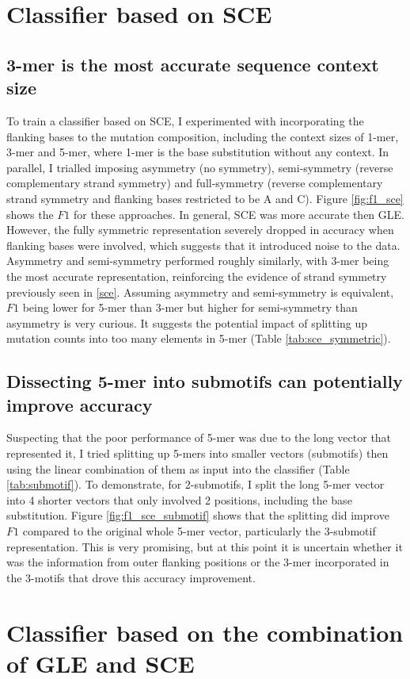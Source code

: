 

\newpage
\section{Classifier based on SCE}\label{ml:sce}

\subsection{3-mer is the most accurate sequence context size}
To train a classifier based on SCE, I experimented with incorporating the flanking bases to the mutation composition, including the context sizes of 1-mer, 3-mer and 5-mer, where 1-mer is the base substitution without any context. In parallel, I trialled imposing asymmetry (no symmetry), semi-symmetry (reverse complementary strand symmetry) and full-symmetry (reverse complementary strand symmetry and flanking bases restricted to be A and C). Figure \ref{fig:f1_sce} shows the $F1$ for these approaches. In general, SCE was more accurate then GLE. However, the fully symmetric representation severely dropped in accuracy when flanking bases were involved, which suggests that it introduced noise to the data. Asymmetry and semi-symmetry performed roughly similarly, with 3-mer being the most accurate representation, reinforcing the evidence of strand symmetry previously seen in \ref{sce}. Assuming asymmetry and semi-symmetry is equivalent, $F1$ being lower for 5-mer than 3-mer but higher for semi-symmetry than asymmetry is very curious. It suggests the potential impact of splitting up mutation counts into too many elements in 5-mer (Table \ref{tab:sce_symmetric}).



\subsection{Dissecting 5-mer into submotifs can potentially improve accuracy}
Suspecting that the poor performance of 5-mer was due to the long vector that represented it, I tried splitting up 5-mers into smaller vectors (submotifs) then using the linear combination of them as input into the classifier (Table \ref{tab:submotif}). To demonstrate, for 2-submotifs, I split the long 5-mer vector into 4 shorter vectors that only involved 2 positions, including the base substitution. Figure \ref{fig:f1_sce_submotif} shows that the splitting did improve $F1$ compared to the original whole 5-mer vector, particularly the 3-submotif representation. This is very promising, but at this point it is uncertain whether it was the information from outer flanking positions or the 3-mer incorporated in the 3-motifs that drove this accuracy improvement.



\section{Classifier based on the combination of GLE and SCE}\label{ml:both}